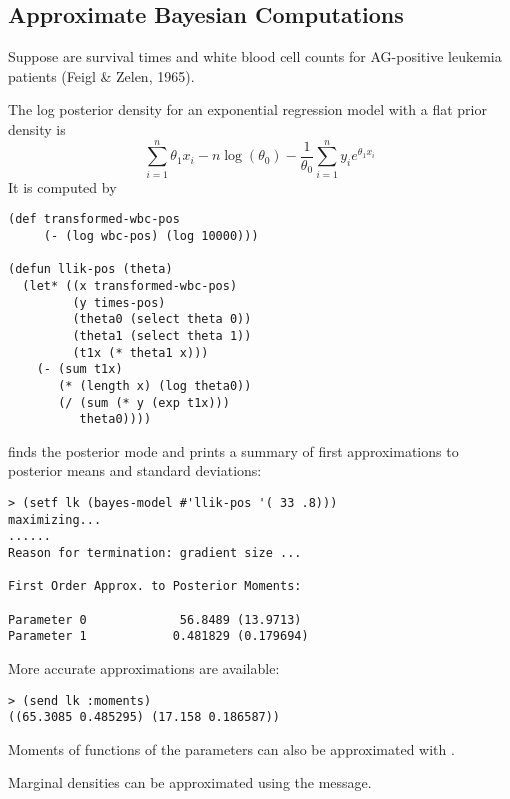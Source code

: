 \begin{slide}{}
\subsection{Approximate Bayesian Computations}
Suppose  are survival times and  white
blood cell counts for AG-positive leukemia patients (Feigl \& Zelen,
1965).

The log posterior density for an exponential regression model with
a flat prior density is
\begin{displaymath}
\sum_{i=1}^{n} \theta_{1} x_{i}
-n \log(\theta_{0}) 
-\frac{1}{\theta_{0}} \sum_{i=1}^{n} y_{i} e^{\theta_{1} x_{i}}
\end{displaymath}
It is computed by
{\Large
\begin{verbatim}
(def transformed-wbc-pos
     (- (log wbc-pos) (log 10000)))

(defun llik-pos (theta)
  (let* ((x transformed-wbc-pos)
         (y times-pos)
         (theta0 (select theta 0))
         (theta1 (select theta 1))
         (t1x (* theta1 x)))
    (- (sum t1x)
       (* (length x) (log theta0))
       (/ (sum (* y (exp t1x)))
          theta0))))
\end{verbatim}}
\end{slide}

\begin{slide}{}
 finds the posterior mode and prints a summary
of first approximations to posterior means and standard deviations:
{\Large
\begin{verbatim}
> (setf lk (bayes-model #'llik-pos '( 33 .8)))
maximizing...
......
Reason for termination: gradient size ...

First Order Approx. to Posterior Moments:

Parameter 0             56.8489 (13.9713)
Parameter 1            0.481829 (0.179694)
\end{verbatim}}
More accurate approximations are available:
{\Large
\begin{verbatim}
> (send lk :moments)
((65.3085 0.485295) (17.158 0.186587))
\end{verbatim}}
Moments of functions of the parameters can also be approximated with
.

Marginal densities can be approximated using the 
message.
\end{slide}

